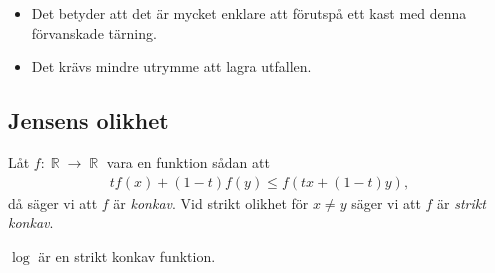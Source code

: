 \documentclass{beamer}
\theoremstyle{definition}
\DeclareMathOperator{\R}{\mathbb{R}}
\begin{document}
\begin{frame}
  \begin{itemize}
    \item Det betyder att det är mycket enklare att förutspå ett kast med denna 
      förvanskade tärning.
    \item Det krävs mindre utrymme att lagra utfallen.
  \end{itemize}
\end{frame}

\subsection{Jensens olikhet}

\begin{frame}{\insertsubsectionhead}
  \begin{definition}
    Låt \(f\colon \R\to \R\) vara en funktion sådan att
    \begin{align*}
      tf(x) + (1-t)f(y) \leq f(tx + (1-t)y),
    \end{align*}
    då säger vi att \(f\) är \emph{konkav}.
    Vid strikt olikhet för \(x\neq y\) säger vi att \(f\) är \emph{strikt 
    konkav}.
  \end{definition}

  \begin{example}
    \(\log\) är en strikt konkav funktion.
  \end{example}
\end{frame}

%
%
\end{document}
